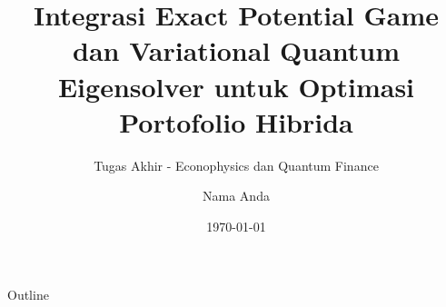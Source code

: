 \documentclass[aspectratio=169]{beamer}
\title[Integrasi EPG  dan   VQE]{Integrasi Exact Potential Game dan  Variational Quantum Eigensolver untuk Optimasi Portofolio Hibrida}
\subtitle{Tugas Akhir - Econophysics  dan   Quantum Finance}
\author[Nama Anda]{Nama Anda} %
\institute[Institusi]{Pembimbing: Nama Pembimbing \\ \medskip Departemen Fisika \\ Universitas ...}
\date{\today}
\begin{document}
\begin{frame}
    \titlepage
\end{frame}

\begin{frame}{Outline}
    \tableofcontents
\end{frame}

\end{document}
